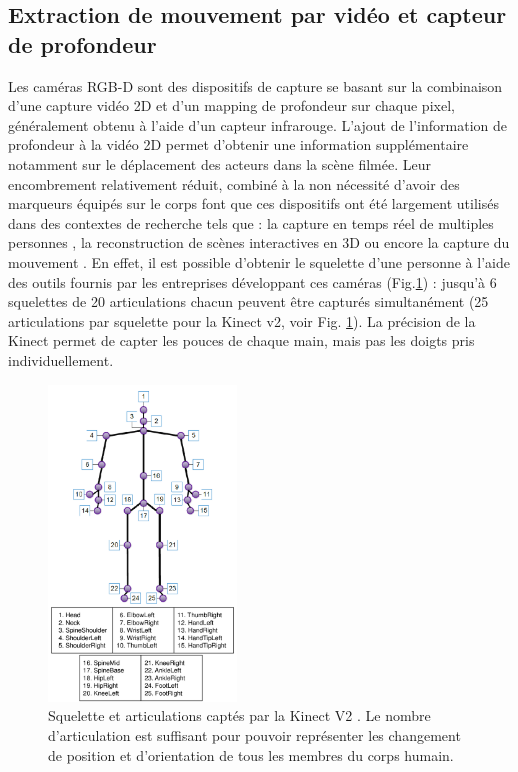 \subsection{Extraction de mouvement par vidéo et capteur de profondeur}
Les caméras RGB-D sont des dispositifs de capture se basant sur la combinaison d'une capture vidéo 2D et d'un mapping de profondeur sur chaque pixel, généralement obtenu à l'aide d'un capteur infrarouge. L'ajout de l'information de profondeur à la vidéo 2D permet d'obtenir une information supplémentaire notamment sur le déplacement des acteurs dans la scène filmée. Leur encombrement relativement réduit, combiné à la non nécessité d’avoir des marqueurs équipés sur le corps font que ces dispositifs ont été largement utilisés dans des contextes de recherche tels que : la capture en temps réel de multiples personnes \parencite{Basso2013}, la reconstruction de scènes interactives en 3D \parencite{Izadi11kinectfusion} ou encore la capture du mouvement \parencite{Yoshinaga2015Doa}. En effet, il est possible d'obtenir le squelette d'une personne à l'aide des outils fournis par les entreprises développant ces caméras (Fig.\ref{fig:skeleton_kinectv2}) : jusqu'à 6 squelettes de 20 articulations chacun peuvent être capturés simultanément (25 articulations par squelette pour la Kinect v2, voir Fig. \ref{fig:skeleton_kinectv2}). La précision de la Kinect permet de capter les pouces de chaque main, mais pas les doigts pris individuellement.\\

\begin{figure}
    \centering
    \includegraphics[width=5cm]{pictures/3D-skeleton-joints-tracked-by-the-Kinect-v2-sensor.png}
    \caption[Squelette et articulations captés par la Kinect V2 \parencite{Faisal2015Kinect}]{Squelette et articulations captés par la Kinect V2 \parencite{Faisal2015Kinect}. Le nombre d'articulation est suffisant pour pouvoir représenter les changement de position et d'orientation de tous les membres du corps humain.}
    \label{fig:skeleton_kinectv2}
\end{figure}


